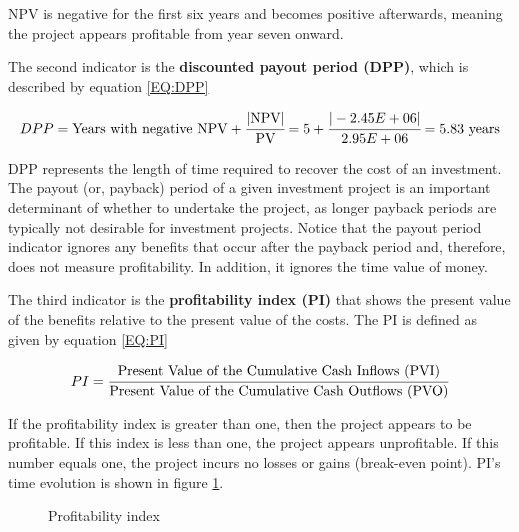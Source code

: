 	NPV is negative for the first six years and becomes positive afterwards, meaning the project appears profitable from year seven onward.
	
	The second indicator is the \textbf{discounted payout period (DPP)}, which is described by equation \ref{EQ:DPP}
	
	{\footnotesize
	\begin{equation}
		DPP = \text{Years with negative NPV} + \cfrac{\text{|NPV|}}{\text{PV}} = 5 + \cfrac{|-2.45E+06|}{2.95E+06} = 5.83~\text{years}
		\label{EQ:DPP}
	\end{equation} }

	DPP	represents the length of time required to recover the cost of an investment. The payout (or, payback) period of a given investment project is an important determinant of whether to undertake the project, as longer payback periods are typically not desirable for investment projects. Notice that the payout period indicator ignores any benefits that occur after the payback period and, therefore, does not measure profitability. In addition, it ignores the time value of money.
	
	The third indicator is the \textbf{profitability index (PI)} that shows the present value of the benefits relative to the present value	of the costs. The PI is defined as given by equation \ref{EQ:PI}
	
	\begin{equation}
		PI = \cfrac{\text{Present Value of the Cumulative Cash Inflows (PVI)}}{\text{Present Value of the Cumulative Cash Outflows (PVO)}}
		\label{EQ:PI}
	\end{equation}
	
	If the profitability index is greater than one, then the project appears to be profitable. If this index is less than one, the project appears unprofitable. If this number equals one, the project incurs no losses or gains (break-even point). PI's time evolution is shown in figure \ref{fig:PI}.
	
	\begin{figure}[h!]
		\centering
		\caption{Profitability index}
		\label{fig:PI}
	\end{figure}

